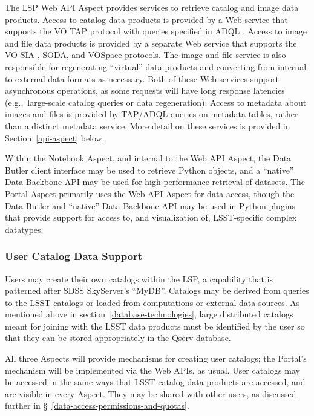 The LSP Web API Aspect provides services to retrieve catalog and image data
products.
Access to catalog data products is provided by a Web service that
supports the VO TAP protocol \citep{2010ivoa.spec.0327D} with queries specified
in ADQL \citep{2008ivoa.spec.1030O}.
Access to image
and file data products is provided by a separate Web service that supports the
VO SIA \citep{2015ivoa.spec.1223D}, SODA, and VOSpace \citep{2013ivoa.spec.0329G} protocols.
The image and file service is also
responsible for regenerating ``virtual'' data products and converting from
internal to external data formats as necessary.
Both of these Web services
support asynchronous operations, as some requests will have long response
latencies (e.g.,\  large-scale catalog queries or data regeneration).
Access to
metadata about images and files is provided by TAP/ADQL queries on metadata
tables, rather than a distinct metadata service.  More detail on these services
is provided in Section~\ref{api-aspect} below.

Within the Notebook Aspect, and internal to the Web API Aspect, the Data
Butler client interface may be used to retrieve Python objects, and a
``native'' Data Backbone API may be used for high-performance retrieval of
datasets.
The Portal Aspect primarily uses the Web API Aspect for data access,
though the Data Butler and ``native'' Data Backbone API may be used in Python
plugins that provide support for access to, and visualization of, LSST-specific
complex datatypes.

\subsubsection{User Catalog Data Support}\label{user-catalog-data-support}

Users may create their own catalogs within the LSP, a capability that is
patterned after SDSS SkyServer's ``MyDB''.
Catalogs may be derived from queries
to the LSST catalogs or loaded from computations or external data sources.  As
mentioned above in section~\ref{database-technologies}, large distributed
catalogs meant for joining with the LSST data products must be identified by
the user so that they can be stored appropriately in the Qserv database.

All three Aspects will provide mechanisms for creating user catalogs; the
Portal's mechanism will be implemented via the Web APIs, as usual.
User catalogs may be accessed in the same ways that LSST catalog data products
are accessed, and are visible in every Aspect.
They may be shared with other users, as discussed further in
\S~\ref{data-access-permissions-and-quotas}.

